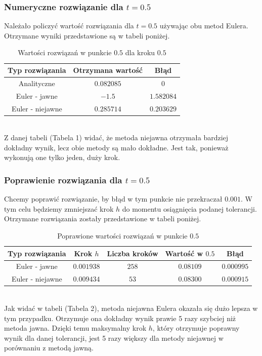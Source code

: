 \documentclass{article}
\begin{document}
\subsubsection{Numeryczne rozwiązanie dla $t=0.5$}
Należało policzyć wartość rozwiązania dla $t=0.5$ używając obu metod Eulera. Otrzymane wyniki przedstawione są w tabeli poniżej.
\begin{table}[h!]
    \centering
    \begin{tabular}{|c|c|c|}
        \hline
        Typ rozwiązania & Otrzymana wartość & Błąd \\
        \hline
        Analityczne & $0.082085$ & $0$ \\
        Euler - jawne & $-1.5$ & $1.582084$ \\
        Euler - niejawne & $0.285714$ & $0.203629$ \\
        \hline
    \end{tabular}
    \caption{Wartości rozwiązań w punkcie $0.5$ dla kroku $0.5$}
    \label{table}
\end{table}
\\
Z danej tabeli (Tabela 1) widać, że metoda niejawna otrzymała bardziej dokładny wynik, lecz obie metody są mało dokładne. Jest tak, ponieważ wykonują one tylko jeden, duży krok.

\subsubsection{Poprawienie rozwiązania dla $t=0.5$}
Chcemy poprawić rozwiązanie, by błąd w tym punkcie nie przekraczał $0.001$. W tym celu będziemy zmniejszać krok $h$ do momentu osiągnięcia podanej tolerancji. Otrzymane rozwiązania zostały przedstawione w tabeli poniżej.
\begin{table}[h!]
    \centering
    \begin{tabular}{|c|c|c|c|c|}
        \hline
        Typ rozwiązania & Krok $h$ & Liczba kroków & Wartość w $0.5$ & Błąd \\
        \hline
        Euler - jawne & $0.001938$ & $258$ & $0.08109$ & $0.000995$ \\
        Euler - niejawne & $0.009434$ & $53$ & $0.08300$ & $0.000915$ \\
        \hline
    \end{tabular}
    \caption{Poprawione wartości rozwiązań w punkcie $0.5$}
    \label{table}
\end{table}
\\
Jak widać w tabeli (Tabela 2), metoda niejawna Eulera okazała się dużo lepsza w tym przypadku. Otrzymuje ona dokładny wynik prawie 5 razy szybciej niż metoda jawna. Dzięki temu maksymalny krok $h$, który otrzymuje poprawny wynik dla danej tolerancji, jest 5 razy większy dla metody niejawnej w porównaniu z metodą jawną.
\end{document}
